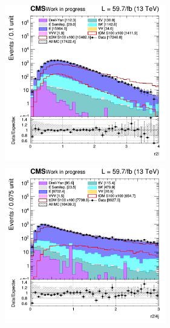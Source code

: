 \documentclass[a4paper, 10pt, openright]{report}
\begin{document}
\begin{figure}[htbp]
\begin{minipage}[b]{.48\textwidth}
\includegraphics[width=7cm, height=7cm]{figs/2018/SmearSR-ttDM-scalar100/log_cratio_topCR_ll_r2l.png}
\end{minipage}\hfill
\begin{minipage}[b]{.48\textwidth}
\includegraphics[width=7cm, height=7cm]{figs/2018/SmearSR-ttDM-scalar100/log_cratio_topCR_ll_r2l4j.png}
\end{minipage} \hfill


\end{figure}
\end{document}
